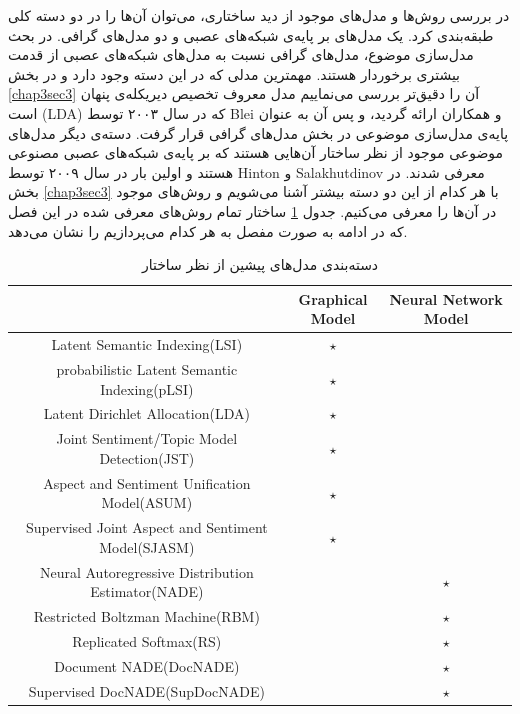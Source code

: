 در بررسی‌ روش‌ها و مدل‌های موجود از دید ساختاری، می‌‌توان آن‌ها را در دو دسته کلی‌ طبقه‌بندی کرد. یک مدل‌های بر پایه‌ی شبکه‌های عصبی و دو مدل‌های گرافی‌. در بحث مدل‌سازی موضوع، مدل‌های گرافی‌ نسبت به مدل‌های شبکه‌های عصبی از قدمت بیشتری برخوردار هستند. مهمترین مدلی‌ که در این دسته وجود دارد و در بخش 
\ref{chap3sec3}
آن را دقیق‌تر بررسی‌ می‌‌نماییم مدل معروف تخصیص دیریکله‌ی پنهان است
 (LDA)
  که در سال ۲۰۰۳ توسط
Blei
و همکاران 
\cite{blei2003latent}
ارائه گردید، و پس آن به عنوان پایه‌ی مدل‌سازی موضوعی در بخش مدل‌های گرافی قرار گرفت. دسته‌ی دیگر مدل‌های موضوعی موجود از نظر ساختار آن‌هایی هستند که بر پایه‌ی شبکه‌های عصبی مصنوعی هستند و اولین بار در سال ۲۰۰۹ توسط
Hinton
و
Salakhutdinov \cite{hinton2009replicated}
معرفی‌ شدند. در بخش‌ 
\ref{chap3sec3}
با هر کدام از این دو دسته بیشتر آشنا می‌‌شویم و روش‌های موجود در آن‌ها را معرفی می‌کنیم. جدول
\ref{tabel3-1}
ساختار تمام روش‌های معرفی‌ شده در این فصل که در ادامه به صورت مفصل به هر کدام می‌پردازیم را نشان می‌‌دهد.
\begin{table}[!t]
	\centering
	\begin{latin}
		\begin{tabular}{|c|c|c|}
			\hline
			                               & Graphical Model & Neural Network Model \\ \hline
			          Latent Semantic Indexing(LSI)            &     $\star$     &  \\ \hline
			   probabilistic Latent Semantic Indexing(pLSI)    &     $\star$     &  \\ \hline
			         Latent Dirichlet Allocation(LDA)          &     $\star$     &  \\ \hline
			    Joint Sentiment/Topic Model Detection(JST)     &     $\star$     &  \\ \hline
			   Aspect and Sentiment Unification Model(ASUM)    &     $\star$     &  \\ \hline
		 Supervised Joint Aspect and Sentiment Model(SJASM)    &     $\star$     &  \\ \hline
			Neural Autoregressive Distribution Estimator(NADE) &                 &       $\star$        \\ \hline
			         Restricted Boltzman Machine(RBM)          &                 &       $\star$        \\ \hline
			              Replicated Softmax(RS)               &                 &       $\star$        \\ \hline
			              Document NADE(DocNADE)               &                 &       $\star$        \\ \hline
			          Supervised DocNADE(SupDocNADE)           &                 &       $\star$        \\ \hline
		\end{tabular}
	\end{latin}
	\caption{دسته‌بندی مدل‌های پیشین از نظر ساختار}
	\label{tabel3-1}
\end{table}


